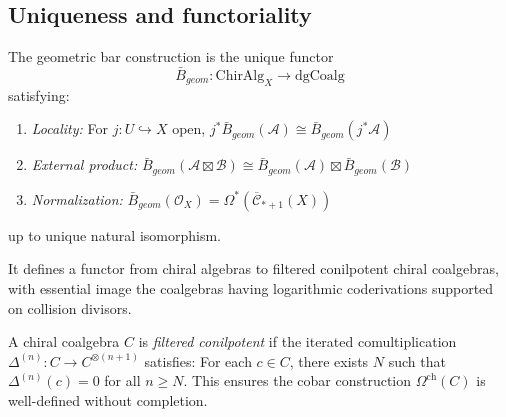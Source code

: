 \subsection{Uniqueness and functoriality}
 
\begin{theorem}\label{thm:bar-uniqueness-functoriality}
The geometric bar construction is the unique functor 
\[\bar{B}_{geom}: \text{ChirAlg}_X \to \text{dgCoalg}\]
satisfying:
\begin{enumerate}
\item \emph{Locality:} For $j: U \hookrightarrow X$ open, $j^*\bar{B}_{geom}(\mathcal{A}) \cong \bar{B}_{geom}(j^*\mathcal{A})$
\item \emph{External product:} $\bar{B}_{geom}(\mathcal{A} \boxtimes \mathcal{B}) \cong \bar{B}_{geom}(\mathcal{A}) \boxtimes \bar{B}_{geom}(\mathcal{B})$
\item \emph{Normalization:} $\bar{B}_{geom}(\mathcal{O}_X) = \Omega^*(\overline{\mathcal{C}}_{*+1}(X))$
\end{enumerate}
up to unique natural isomorphism.

It defines a functor from chiral algebras to filtered conilpotent chiral coalgebras, with essential image the coalgebras having logarithmic coderivations supported on collision divisors.
\end{theorem}

 
\begin{definition}
A chiral coalgebra $C$ is \emph{filtered conilpotent} if the iterated comultiplication 
$\Delta^{(n)} : C \to C^{\otimes(n+1)}$ satisfies: For each $c \in C$, there exists 
$N$ such that $\Delta^{(n)}(c) = 0$ for all $n \geq N$. This ensures the cobar 
construction $\Omega^{\text{ch}}(C)$ is well-defined without completion.
\end{definition}



